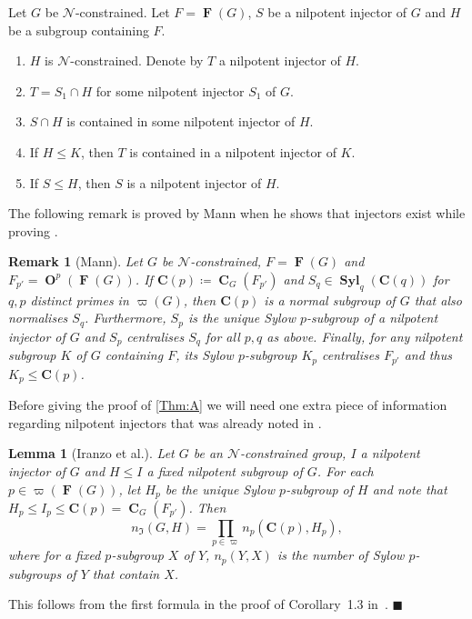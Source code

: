 \documentclass[10pt,a4paper]{amsart}
\numberwithin{equation}{section}
\DeclareMathOperator{\fitt}{\mathbf{F}}
\DeclareMathOperator{\cent}{\mathbf{C}}
\DeclareMathOperator{\oh}{\mathbf{O}}
\DeclareMathOperator{\syl}{\mathbf{Syl}}
\renewcommand{\leq}{\leqslant}
\newenvironment{proofof}{{\bf {Proof.} }}{\hfill $\blacksquare$ \\}
\def\C_p{{\mathbf{C}(p)}}
\newtheorem{lemma}[theorem]{Lemma}
\newtheorem{remark}[theorem]{Remark}
\begin{document}
Let $G$ be $\mathcal{N}$-constrained. 
Let $F = \fitt(G)$, $S$ be a nilpotent injector of $G$ 
and $H$ be a subgroup containing $F$.
\begin{enumerate}[label={\upshape(\alph*)}]
\item\label{alpha} $H$ is $\mathcal{N}$-constrained. 
Denote by $T$ a nilpotent injector of $H$.
\item\label{beta} $T = S_1 \cap H$ for some nilpotent injector $S_1$ of $G$.
\item\label{gamma} $S \cap H$ is contained in some nilpotent injector of $H$.
\item\label{delta} If $H \leq K$, then $T$ is contained in a nilpotent injector of $K$.
\item\label{epsilon} If $S \leq H$, then $S$ is a nilpotent injector of $H$.
\end{enumerate}
 
 
 The following remark is proved by Mann when he shows that injectors exist while proving \cite[Theorem 1]{mann_injectors}.

\begin{remark}[Mann]
\label{Rem:Mann}
Let $G$ be $\mathcal{N}$-constrained,  $F = \fitt(G)$ and  $F_{p'} = \oh^p(\fitt(G))$. If  $\C_p \coloneqq \cent_G(F_{p'})$ and $S_q \in \syl_q(\mathbf{C}(q))$ for $q , p $ distinct primes in $\varpi (G)$, then $\C_p$ is a normal subgroup of $G$ that also   normalises  $S_q$.
Furthermore,   $S_p$ is  the unique Sylow $p$-subgroup
of a nilpotent injector of $G$ and $S_p$ centralises $S_q$ for all  $p,q$ as above.  Finally,  for any  nilpotent subgroup $K$ of $G$ containing $F$, its
 Sylow $p$-subgroup $K_p$ 
centralises $F_{p'}$ and thus $K_p \leq \C_p$.     
\end{remark}

Before giving the proof of \autoref{Thm:A} we will need one extra piece of information regarding nilpotent  injectors that was already noted in \cite{arithmetical_questions}.

\begin{lemma}[Iranzo et al.]
\label{Lem:Product}
Let $G$ be an $\mathcal{N}$-constrained group, $I$ a nilpotent injector of $G$ and  $H \leq I$ a fixed nilpotent subgroup of $G$. 
For each $p \in \varpi(\fitt(G))$, 
let $H_p$ be the unique Sylow $p$-subgroup of $H$
and note that $H_p \leq I_p \leq \C_p = \cent_G(F_{p'})$.
Then
\[
n_\mathfrak{I}(G, H) = \prod_{p \in \varpi} n_p(\C_p, H_p),
\]
where 
for a fixed $p$-subgroup $X$ of $Y$, 
$n_p(Y, X)$ is the number of Sylow $p$-subgroups of $Y$ that contain $X$.
\end{lemma}
\begin{proofof}
This follows from the first formula in the proof of Corollary~1.3 in~\cite{arithmetical_questions}.  
\end{proofof}
\end{document}
